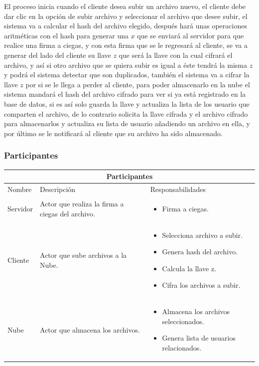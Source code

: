 El proceso inicia cuando el cliente desea subir un archivo nuevo, el cliente debe dar clic en la opción de subir archivo y seleccionar el archivo que desee subir, el sistema va a calcular el hash del archivo elegido, después hará unas operaciones aritméticas con el hash para generar una $x$ que se enviará al servidor para que realice una firma a ciegas, y con esta firma que se le regresará al cliente, se va a generar del lado del cliente su llave $z$ que será la llave con la cual cifrará el archivo, y así si otro archivo que se quiera subir es igual a éste tendrá la misma $z$ y podrá el sistema detectar que son duplicados, también el sistema va a cifrar la llave $z$ por si se le llega a perder al cliente, para poder almacenarlo en la nube el sistema mandará el hash del archivo cifrado para ver si ya está registrado en la base de datos, si es así solo guarda la llave y actualiza la lista de los usuario que comparten el archivo, de lo contrario solicita la llave cifrada y el archivo cifrado para almacenarlos y actualiza su lista de usuario añadiendo un archivo en ella, y por último se le notificará al cliente que su archivo ha sido almacenado.



\subsubsection{Participantes}

\begin{tabular}{ |p{2cm}|p{6cm}|p{6cm}| }
\hline
\multicolumn{3}{|c|}{ Participantes } \\
\hline

{ Nombre } & { Descripción } & { Responsabilidades} \\
\hline
{ Servidor } & Actor que realiza la firma a ciegas del archivo. & 
\begin{itemize} 
\item Firma a ciegas.

\end{itemize} \\ 
\hline
{ Cliente } & Actor que sube archivos a la Nube. & 
\begin{itemize} 
\item Selecciona archivo a subir.
\item Genera hash del archivo. 
\item Calcula la llave z.
\item Cifra los archivos a subir.
\end{itemize} \\ 
\hline
{ Nube } & Actor que almacena los archivos. & 
\begin{itemize} 
\item Almacena los archivos seleccionados.
\item Genera lista de usuarios relacionados.
\end{itemize} \\ 
\hline
\end{tabular}


